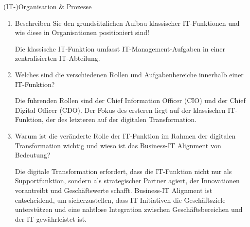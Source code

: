 \documentclass{article}
\begin{document}
\begin{exercise}{(IT-)Organisation \& Prozesse}
\begin{enumerate}
    \item Beschreiben Sie den grundsätzlichen Aufbau klassischer IT-Funktionen und wie diese in Organisationen positioniert sind!
          \begin{solution}
            Die klassische IT-Funktion umfasst IT-Management-Aufgaben in einer zentralisierten IT-Abteilung.
          \end{solution}

    \item Welches sind die verschiedenen Rollen und Aufgabenbereiche innerhalb einer IT-Funktion?
          \begin{solution}
            Die führenden Rollen sind der Chief Information Officer (CIO) und der Chief Digital Officer (CDO). Der Fokus des ersteren liegt auf der klassischen IT-Funktion, der des letzteren auf der digitalen Transformation.
          \end{solution}

    \item Warum ist die veränderte Rolle der IT-Funktion im Rahmen der digitalen Transformation wichtig und wieso ist das Business-IT Alignment von Bedeutung?
          \begin{solution}
            Die digitale Transformation erfordert, dass die IT-Funktion nicht nur als Supportfunktion, sondern als strategischer Partner agiert, der Innovationen vorantreibt und Geschäftswerte schafft. Business-IT Alignment ist entscheidend, um sicherzustellen, dass IT-Initiativen die Geschäftsziele unterstützen und eine nahtlose Integration zwischen Geschäftsbereichen und der IT gewährleistet ist.
          \end{solution}
  \end{enumerate}
\end{exercise}
\end{document}
